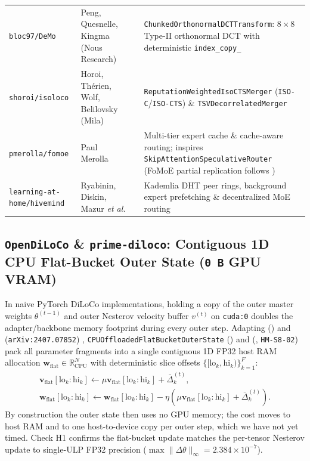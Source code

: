 \documentclass[11pt,a4paper]{article}
\begin{document}
\begin{table}[ht!]
{\begin{tabular}{@{}lllp{5.8cm}@{}}
\texttt{bloc97/DeMo} & Peng, Quesnelle, Kingma (Nous Research) & \cite{peng2024demo} & \texttt{ChunkedOrthonormalDCTTransform}: $8 \times 8$ Type-II orthonormal DCT with deterministic \texttt{index\_copy\_} \\
\texttt{shoroi/isoloco} & Horoi, Th\'erien, Wolf, Belilovsky (Mila) & \cite{horoi2026isoloco,marczak2025iso} & \texttt{ReputationWeightedIsoCTSMerger} (\texttt{ISO-C}/\texttt{ISO-CTS}) \& \texttt{TSVDecorrelatedMerger} \\
\texttt{pmerolla/fomoe} & Paul Merolla & \cite{merolla2025fomoe} & Multi-tier expert cache \& cache-aware routing; inspires \texttt{SkipAttentionSpeculativeRouter} (FoMoE partial replication follows \cite{sani2026fomoe}) \\
\texttt{learning-at-home/hivemind} & Ryabinin, Diskin, Mazur \textit{et al.} & \cite{ryabinin2020hivemind,borzunov2023petals} & Kademlia DHT peer rings, background expert prefetching \& decentralized MoE routing \\
\bottomrule
\end{tabular}%
}
\end{table}

\subsection{\texttt{OpenDiLoCo} \& \texttt{prime-diloco}: Contiguous 1D CPU Flat-Bucket Outer State (\texttt{0\,B} GPU VRAM)}

In naive PyTorch DiLoCo implementations, holding a copy of the outer master weights $\theta^{(t-1)}$ and outer Nesterov velocity buffer $v^{(t)}$ on \texttt{cuda:0} doubles the adapter/backbone memory footprint during every outer step. Adapting  () and  (\texttt{arXiv:2407.07852}) \cite{jaghouar2024opendiloco}, \texttt{CPUOffloadedFlatBucketOuterState} () and  (, \texttt{HM-S8-02}) pack all parameter fragments into a single contiguous 1D FP32 host RAM allocation $\mathbf{w}_{\text{flat}} \in \mathbb{R}^N_{\text{CPU}}$ with deterministic slice offsets $\{[\text{lo}_k, \text{hi}_k)\}_{k=1}^F$:
\begin{gather}
    \mathbf{v}_{\text{flat}}[\text{lo}_k:\text{hi}_k] \leftarrow \mu \mathbf{v}_{\text{flat}}[\text{lo}_k:\text{hi}_k] + \bar{\Delta}_k^{(t)}, \nonumber\\
    \mathbf{w}_{\text{flat}}[\text{lo}_k:\text{hi}_k] \leftarrow \mathbf{w}_{\text{flat}}[\text{lo}_k:\text{hi}_k] - \eta \left(\mu \mathbf{v}_{\text{flat}}[\text{lo}_k:\text{hi}_k] + \bar{\Delta}_k^{(t)}\right).
\end{gather}
By construction the outer state then uses no GPU memory; the cost moves to host RAM and to one host-to-device copy per outer step, which we have not yet timed. Check H1 confirms the flat-bucket update matches the per-tensor Nesterov update to single-ULP FP32 precision ($\max \|\Delta \theta\|_\infty = 2.384 \times 10^{-7}$).
\end{document}

